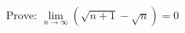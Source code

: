 \documentclass[preview]{standalone}
\begin{document}
\begin{align*}
\text{Prove: } \lim_{n\to\infty} \left( \sqrt{n+1} - \sqrt{n} \right) = 0
\end{align*}
\end{document}
